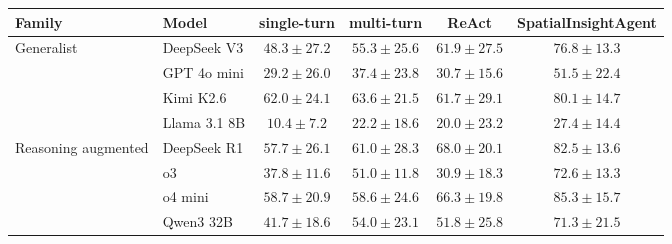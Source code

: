 \begin{tabular}{llcccc}
\toprule
Family & Model & single-turn & multi-turn & ReAct & SpatialInsightAgent \\
\midrule
\multirow{4}{*}{Generalist}
 & DeepSeek V3 & $48.3 \pm 27.2$ & $55.3 \pm 25.6$ & $61.9 \pm 27.5$ & $76.8 \pm 13.3$ \\
 & GPT 4o mini & $29.2 \pm 26.0$ & $37.4 \pm 23.8$ & $30.7 \pm 15.6$ & $51.5 \pm 22.4$ \\
 & Kimi K2.6 & $62.0 \pm 24.1$ & $63.6 \pm 21.5$ & $61.7 \pm 29.1$ & $80.1 \pm 14.7$ \\
 & Llama 3.1 8B & $10.4 \pm 7.2$ & $22.2 \pm 18.6$ & $20.0 \pm 23.2$ & $27.4 \pm 14.4$ \\
\midrule
\multirow{4}{*}{Reasoning augmented}
 & DeepSeek R1 & $57.7 \pm 26.1$ & $61.0 \pm 28.3$ & $68.0 \pm 20.1$ & $82.5 \pm 13.6$ \\
 & o3 & $37.8 \pm 11.6$ & $51.0 \pm 11.8$ & $30.9 \pm 18.3$ & $72.6 \pm 13.3$ \\
 & o4 mini & $58.7 \pm 20.9$ & $58.6 \pm 24.6$ & $66.3 \pm 19.8$ & $85.3 \pm 15.7$ \\
 & Qwen3 32B & $41.7 \pm 18.6$ & $54.0 \pm 23.1$ & $51.8 \pm 25.8$ & $71.3 \pm 21.5$ \\
\bottomrule
\end{tabular}
